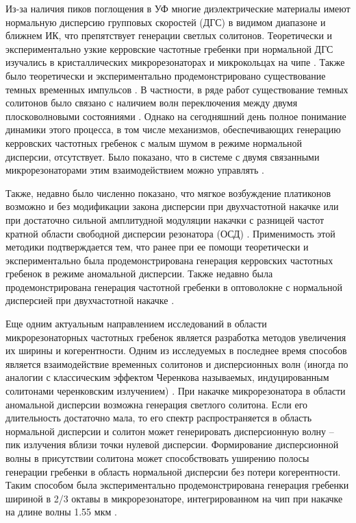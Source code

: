 Из-за наличия пиков поглощения в УФ многие диэлектрические материалы имеют нормальную дисперсию групповых скоростей (ДГС) в видимом диапазоне и ближнем ИК, что препятствует генерации светлых солитонов. Теоретически и экспериментально узкие керровские частотные гребенки при нормальной ДГС изучались в кристаллических микрорезонаторах \cite{Coillet2013,Liang2014,Henriet2015} и микрокольцах на чипе \cite{Huang2015prl}. Также было теоретически и экспериментально продемонстрировано существование темных временных импульсов \cite{Godey2014,Xue2015,Lobanov2015,ParraRivas2016}. В частности, в ряде работ существование темных солитонов было связано с наличием волн переключения между двумя плосковолновыми состояниями \cite{ParraRivas2016}. Однако на сегодняшний день полное понимание динамики этого процесса, в том числе механизмов, обеспечивающих генерацию керровских частотных гребенок с малым шумом в режиме нормальной дисперсии, отсутствует. %
Было показано, что в системе с двумя связанными микрорезонаторами этим взаимодействием можно управлять \cite{Liu2015}. 

Также, недавно было численно показано, что мягкое возбуждение платиконов возможно и без модификации закона дисперсии при двухчастотной накачке или при достаточно сильной амплитудной модуляции накачки с разницей частот кратной области свободной дисперсии резонатора (ОСД) \cite{Lobanov2015epl}. Применимость этой методики подтверждается тем, что ранее при ее помощи теоретически \cite{Hansson2014} и экспериментально \cite{Strekalov2009} была продемонстрирована генерация керровских частотных гребенок в режиме аномальной дисперсии. Также недавно была продемонстрирована генерация частотной гребенки в оптоволокне с нормальной дисперсией при двухчастотной накачке \cite{Antikainen2015}.
%

Еще одним актуальным направлением исследований в области микрорезонаторных частотных гребенок является разработка методов увеличения их ширины и когерентности. Одним из исследуемых в последнее время способов является взаимодействие временных солитонов и дисперсионных волн (иногда по аналогии с классическим эффектом Черенкова называемых, индуцированным  солитонами черенковским излучением) \cite{Brasch2016,Akhmediev1995,Barashenkov2011,Jang2014,Milian2014,Yang2016}. При накачке микрорезонатора в области аномальной дисперсии возможна генерация светлого солитона. Если его длительность достаточно мала, то его спектр распространяется в область нормальной дисперсии и солитон может генерировать дисперсионную волну – пик излучения вблизи точки нулевой дисперсии. Формирование дисперсионной волны в присутствии солитона может способствовать уширению полосы генерации гребенки в область нормальной дисперсии без потери когерентности. Таким способом была экспериментально продемонстрирована генерация гребенки шириной в 2/3 октавы в микрорезонаторе, интегрированном на чип при накачке на длине волны 1.55 мкм \cite{Brasch2016}.


